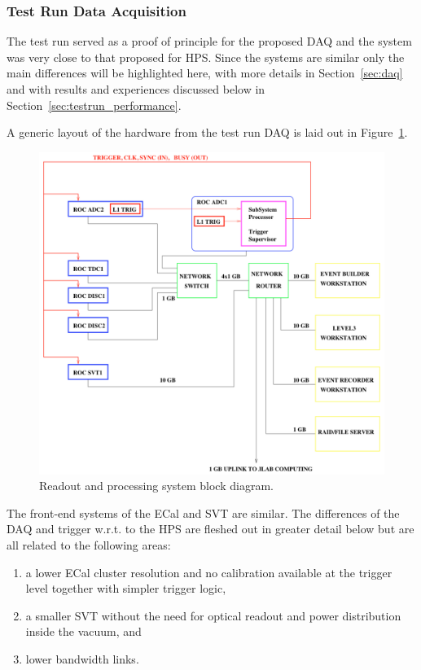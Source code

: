
\subsubsection{Test Run Data Acquisition}
\label{sec:testrun_daq}
The test run served as a proof of principle for the proposed DAQ and the system was very 
close to that proposed for HPS. Since the systems are similar only the main differences will be highlighted here,  with more details in Section~\ref{sec:daq} and with results and experiences discussed below in Section~\ref{sec:testrun_performance}. 


A generic layout of the hardware from the test run DAQ is laid out in Figure~\ref{fig:daq}.
 \begin{figure}[h]
\includegraphics[scale=0.35]{test2012/daq/daq_schem.pdf}
\caption{\small{Readout and processing system block diagram.}}\label{fig:daq}
\end{figure}
The front-end systems of the ECal and SVT are similar. 
The differences of the DAQ and trigger w.r.t. to the HPS are fleshed out in greater detail below but 
are all related to the following areas:
\begin{enumerate}
\item a lower ECal cluster resolution and no calibration available at the trigger level together with simpler trigger logic, 
\item a smaller SVT without the need for optical readout and power distribution inside the vacuum,
and
\item lower bandwidth links.
\end{enumerate}

